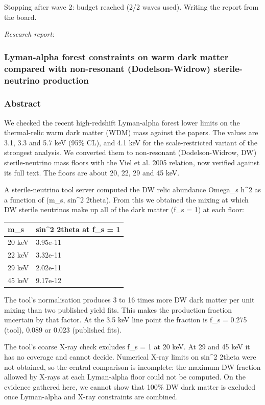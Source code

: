 \documentclass[11pt,a4paper]{article}
\begin{document}
Stopping after wave 2: budget reached (2/2 waves used). Writing the report from the board.

\textit{Research report:}\par
\subsubsection*{Lyman-alpha forest constraints on warm dark matter compared with non-resonant (Dodelson-Widrow) sterile-neutrino production}
\subsubsection*{Abstract}
We checked the recent high-redshift Lyman-alpha forest lower limits on the thermal-relic warm dark matter (WDM) mass against the papers. The values are 3.1, 3.3 and 5.7 keV (95\% CL), and 4.1 keV for the scale-restricted variant of the strongest analysis. We converted them to non-resonant (Dodelson-Widrow, DW) sterile-neutrino mass floors with the Viel et al. 2005 relation, now verified against its full text. The floors are about 20, 22, 29 and 45 keV.

A sterile-neutrino tool server computed the DW relic abundance Omega\_s h\textasciicircum{}2 as a function of (m\_s, sin\textasciicircum{}2 2theta). From this we obtained the mixing at which DW sterile neutrinos make up all of the dark matter (f\_s = 1) at each floor:

\begin{longtable}{@{}p{}p{}@{}}
\toprule
\textbf{m\_s} & \textbf{sin\textasciicircum{}2 2theta at f\_s = 1} \\ \midrule \endhead
20 keV & 3.95e-11 \\
22 keV & 3.32e-11 \\
29 keV & 2.02e-11 \\
45 keV & 9.17e-12 \\
\bottomrule\end{longtable}
The tool's normalisation produces 3 to 16 times more DW dark matter per unit mixing than two published yield fits. This makes the production fraction uncertain by that factor. At the 3.5 keV line point the fraction is f\_s = 0.275 (tool), 0.089 or 0.023 (published fits).

The tool's coarse X-ray check excludes f\_s = 1 at 20 keV. At 29 and 45 keV it has no coverage and cannot decide. Numerical X-ray limits on sin\textasciicircum{}2 2theta were not obtained, so the central comparison is incomplete: the maximum DW fraction allowed by X-rays at each Lyman-alpha floor could not be computed. On the evidence gathered here, we cannot show that 100\% DW dark matter is excluded once Lyman-alpha and X-ray constraints are combined.
\end{document}
